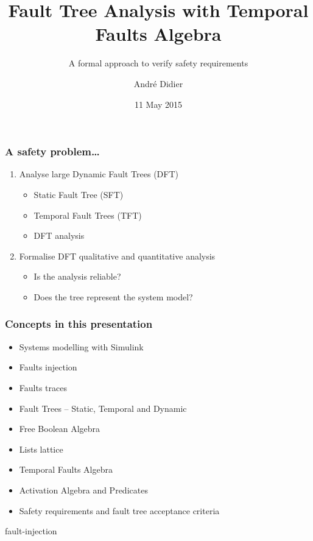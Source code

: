 \documentclass{beamer}
\title{Fault Tree Analysis with Temporal Faults Algebra}
\subtitle{A formal approach to verify safety requirements}
\author{André Didier}
\date{11 May 2015}
\begin{document}
\begin{frame}
\titlepage
\end{frame}

\begin{frame}
\frametitle{A safety problem\ldots}
\begin{enumerate}
  \item Analyse \alert<4>{large} Dynamic Fault Trees (DFT)\\
    \begin{minipage}[c]{4.60cm}
        \begin{itemize}
          \item Static Fault Tree (SFT) 
          \item Temporal Fault Trees (TFT)
          \item DFT analysis 
        \end{itemize}
    \end{minipage}
    \begin{minipage}[c]{5.3cm}
    \end{minipage}
  \item Formalise DFT qualitative and quantitative analysis
    \begin{itemize}
      \item<3-> Is the analysis reliable?
      \item<3-> Does the tree represent the system model?
    \end{itemize}
\end{enumerate}
\end{frame}

\begin{frame}
\frametitle{Concepts in this presentation}

\begin{itemize}
  \item \alert<2>{Systems modelling with Simulink}
  \item \alert<2>{Faults injection}
  \item \alert<2>{Faults traces}
  \item Fault Trees -- \alert<2>{Static}, Temporal and Dynamic
  \item Free Boolean Algebra
  \item Lists lattice
  \item Temporal Faults Algebra
  \item Activation Algebra and Predicates
  \item Safety requirements and fault tree acceptance criteria
\end{itemize}

\end{frame}

 {fault-injection}


\end{document}
